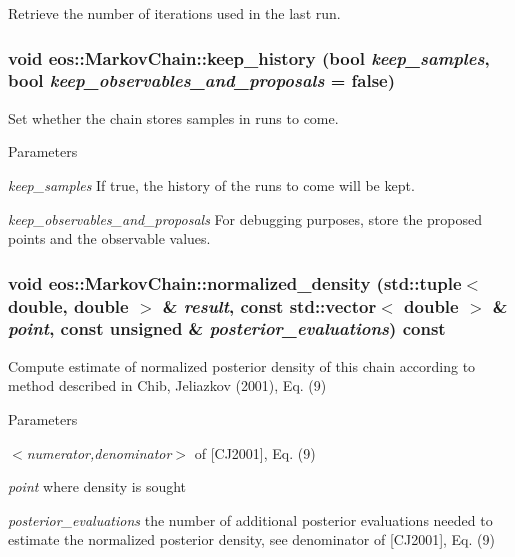 Retrieve the number of iterations used in the last run. \hypertarget{classeos_1_1MarkovChain_a8aa1b0fac7040d32e42a8b2a8a508743}{
\subsubsection[{keep\_\-history}]{\setlength{\rightskip}{0pt plus 5cm}void eos::MarkovChain::keep\_\-history (bool {\em keep\_\-samples}, \/  bool {\em keep\_\-observables\_\-and\_\-proposals} = {\ttfamily false})}}
\label{classeos_1_1MarkovChain_a8aa1b0fac7040d32e42a8b2a8a508743}
Set whether the chain stores samples in runs to come.


\begin{DoxyParams}{Parameters}
\item[{\em keep\_\-samples}]If true, the history of the runs to come will be kept. \item[{\em keep\_\-observables\_\-and\_\-proposals}]For debugging purposes, store the proposed points and the observable values. \end{DoxyParams}
\hypertarget{classeos_1_1MarkovChain_a0424b9803e0a479c88f76713455662fa}{
\subsubsection[{normalized\_\-density}]{\setlength{\rightskip}{0pt plus 5cm}void eos::MarkovChain::normalized\_\-density (std::tuple$<$ double, double $>$ \& {\em result}, \/  const std::vector$<$ double $>$ \& {\em point}, \/  const unsigned \& {\em posterior\_\-evaluations}) const}}
\label{classeos_1_1MarkovChain_a0424b9803e0a479c88f76713455662fa}
Compute estimate of normalized posterior density of this chain according to method described in Chib, Jeliazkov (2001), Eq. (9) 
\begin{DoxyParams}{Parameters}
\item[{\em $<$numerator,denominator$>$}]of \mbox{[}CJ2001\mbox{]}, Eq. (9) \item[{\em point}]where density is sought \item[{\em posterior\_\-evaluations}]the number of additional posterior evaluations needed to estimate the normalized posterior density, see denominator of \mbox{[}CJ2001\mbox{]}, Eq. (9) \end{DoxyParams}
